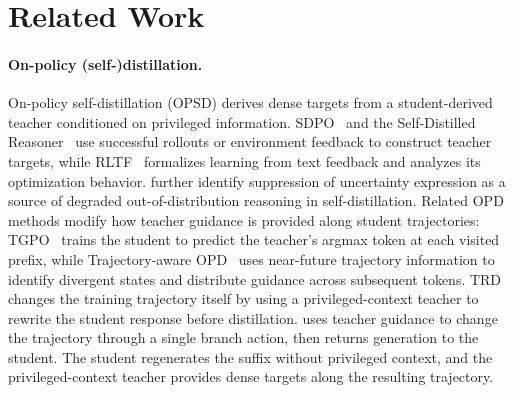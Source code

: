 \section{Related Work}
\label{sec:related}

\paragraph{On-policy (self-)distillation.}
On-policy self-distillation (OPSD) derives dense targets from a student-derived teacher conditioned on privileged information. SDPO~\citep{hubotter2026sdpo} and the Self-Distilled Reasoner~\citep{zhao2026sdr} use successful rollouts or environment feedback to construct teacher targets, while RLTF~\citep{song2026rltf} formalizes learning from text feedback and analyzes its optimization behavior. 
\citet{kim2026why} further identify suppression of uncertainty expression as a source of degraded out-of-distribution reasoning in self-distillation.
Related OPD methods modify how teacher guidance is provided along student trajectories: TGPO~\citep{liu2026teacherguidedpolicyoptimizationonpolicy} trains the student to predict the teacher's argmax token at each visited prefix, while Trajectory-aware OPD~\citep{jiang2026topd} uses near-future trajectory information to identify divergent states and distribute guidance across subsequent tokens. TRD~\citep{jiang2026trajectory} changes the training trajectory itself by using a privileged-context teacher to rewrite the student response before distillation. \method{} uses teacher guidance to change the trajectory through a single branch action, then returns generation to the student. The student regenerates the suffix without privileged context, and the privileged-context teacher provides dense targets along the resulting trajectory.


